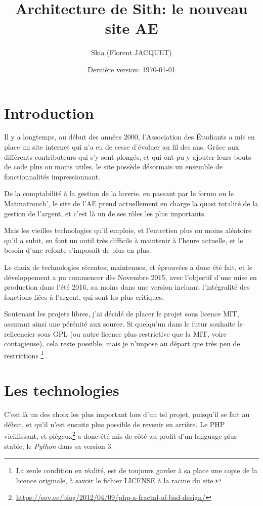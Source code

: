 \documentclass[a4paper]{report}
\title{Architecture de Sith: le nouveau site AE}
\author{Skia (Florent JACQUET)}
\date{Dernière version: \today}
\begin{document}
\maketitle

\tableofcontents

\chapter{Introduction}
\par Il y a longtemps, au début des années 2000, l'Association des Étudiants a mis en place un site internet qui n'a eu de
cesse d'évoluer au fil des ans. Grâce aux différents contributeurs qui s'y sont plongés, et qui ont pu y ajouter leurs
bouts de code plus ou moins utiles, le site possède désormais un ensemble de fonctionnalités impressionnant.
\par De la comptabilité à la gestion de la laverie, en passant par le forum ou le Matmatronch', le site de l'AE prend
actuellement en charge la quasi totalité de la gestion de l'argent, et c'est là un de ses rôles les plus importants.
\par Mais les vieilles technologies qu'il emploie, et l'entretien plus ou moins aléatoire qu'il a subit, en font un
outil très difficile à maintenir à l'heure actuelle, et le besoin d'une refonte s'imposait de plus en plus.
\par Le choix de technologies récentes, maintenues, et éprouvées a donc été fait, et le développement a pu commencer dès
Novembre 2015, avec l'objectif d'une mise en production dans l'été 2016, au moins dans une version incluant
l'intégralité des fonctions liées à l'argent, qui sont les plus critiques.
\par Soutenant les projets libres, j'ai décidé de placer le projet sous licence MIT, assurant ainsi une pérénité aux
source. Si quelqu'un dans le futur souhaite le relicencier sous GPL (ou autre licence plus restrictive que la MIT, voire
contagieuse), cela reste possible, mais je n'impose au départ que très peu de restrictions \footnote{La seule condition
en réalité, est de toujours garder à sa place une copie de la licence originale, à savoir le fichier LICENSE à la racine
du site.} .

\chapter{Les technologies}
\label{cha:les_technologies}
\par C'est là un des choix les plus important lors d'un tel projet, puisqu'il se fait au début, et qu'il n'est ensuite plus
possible de revenir en arrière. Le PHP vieillissant, et
piègeux\footnote{\url{https://eev.ee/blog/2012/04/09/php-a-fractal-of-bad-design/}} a donc été mis de côté au profit
d'un language plus stable, le \emph{Python} dans sa version 3.
\end{document}
